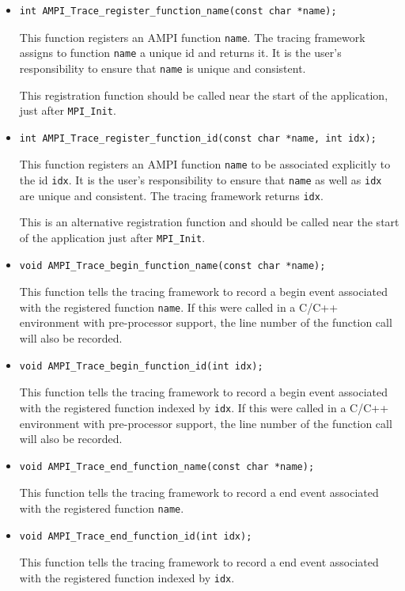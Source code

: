 \documentclass[10pt]{report}
\begin{document}
\begin{itemize}
\item 
\begin{verbatim}
int AMPI_Trace_register_function_name(const char *name);
\end{verbatim}
This function registers an AMPI function {\tt name}. The tracing
framework assigns to function {\tt name} a unique id and returns
it. It is the user's responsibility to ensure that {\tt name} is
unique and consistent.

This registration function should be called near the start of the
application, just after {\tt MPI\_Init}.

\item
\begin{verbatim}
int AMPI_Trace_register_function_id(const char *name, int idx);
\end{verbatim}
This function registers an AMPI function {\tt name} to be associated
explicitly to the id {\tt idx}. It is the user's responsibility to 
ensure that {\tt name} as well as {\tt idx} are unique and consistent.
The tracing framework returns {\tt idx}.

This is an alternative registration function and should be called near
the start of the application just after {\tt MPI\_Init}.

\item
\begin{verbatim}
void AMPI_Trace_begin_function_name(const char *name);
\end{verbatim}
This function tells the tracing framework to record a begin event
associated with the registered function {\tt name}. If this were called
in a C/C++ environment with pre-processor support, the line number of
the function call will also be recorded.

\item
\begin{verbatim}
void AMPI_Trace_begin_function_id(int idx);
\end{verbatim}
This function tells the tracing framework to record a begin event
associated with the registered function indexed by {\tt idx}. If this were
called in a C/C++ environment with pre-processor support, the line number
of the function call will also be recorded.

\item
\begin{verbatim}
void AMPI_Trace_end_function_name(const char *name);
\end{verbatim}
This function tells the tracing framework to record a end event
associated with the registered function {\tt name}.

\item
\begin{verbatim}
void AMPI_Trace_end_function_id(int idx);
\end{verbatim}
This function tells the tracing framework to record a end event
associated with the registered function indexed by {\tt idx}.

\end{itemize}
\end{document}

